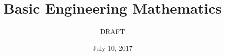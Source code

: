 \documentclass[a4paper,fleqn,12pt]{article}
\title{Basic Engineering Mathematics}
\author{DRAFT}
\date{July 10, 2017}
\begin{document}
\maketitle
\pagebreak

\pagebreak
\tableofcontents

\end{document}
